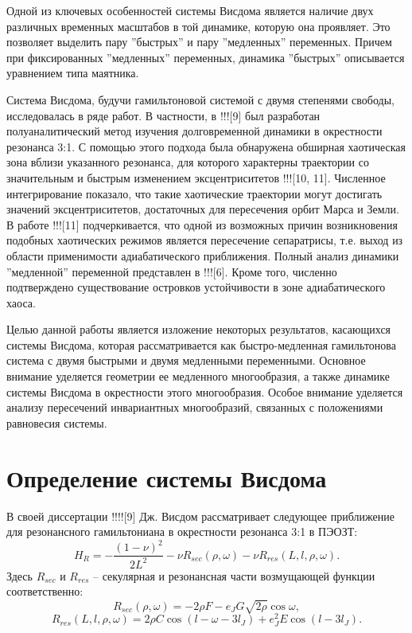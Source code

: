 Одной из ключевых особенностей системы Висдома является наличие двух различных временных масштабов в той динамике, которую она проявляет. Это позволяет выделить пару ''быстрых'' и пару ''медленных'' переменных. Причем при фиксированных ''медленных'' переменных, динамика ''быстрых'' описывается уравнением типа маятника.

Система Висдома, будучи гамильтоновой системой с двумя степенями свободы, исследовалась в ряде работ. В частности, в !!![9] был разработан полуаналитический метод изучения долговременной динамики в окрестности резонанса 3:1. С помощью этого подхода была обнаружена обширная хаотическая зона вблизи указанного резонанса, для которого характерны траектории со значительным и быстрым изменением эксцентриситетов !!![10, 11]. Численное интегрирование показало, что такие хаотические траектории могут достигать значений эксцентриситетов, достаточных для пересечения орбит Марса и Земли. В работе !!![11] подчеркивается, что одной из возможных причин возникновения подобных хаотических режимов является пересечение сепаратрисы, т.е. выход из области применимости адиабатического приближения. Полный анализ динамики ''медленной'' переменной представлен в !!![6]. Кроме того, численно подтверждено существование островков устойчивости в зоне адиабатического хаоса.

Целью данной работы является изложение некоторых результатов, касающихся системы Висдома, которая рассматривается как быстро-медленная гамильтонова система с двумя быстрыми и двумя медленными переменными. Основное внимание уделяется геометрии ее медленного многообразия, а также динамике системы Висдома в окрестности этого многообразия. Особое внимание уделяется анализу пересечений инвариантных многообразий, связанных с положениями равновесия системы.

\section{Определение системы Висдома}

В своей диссертации !!!![9] Дж. Висдом рассматривает следующее приближение для резонансного гамильтониана в окрестности резонанса 3:1 в ПЭОЗТ:
\begin{equation}
    H_R = - \frac{(1-\nu)^2}{2L^2} - \nu R_{sec}(\rho, \omega) - \nu R_{res}(L,l,\rho,\omega).
    \label{hamres}
\end{equation}
Здесь $R_{sec}$ и  $R_{res}$ -- секулярная и резонансная части возмущающей функции соответственно:
$$R_{sec}(\rho, \omega) = - 2 \rho F - e_J G \sqrt{2 \rho} \cos \omega,$$
$$R_{res}(L,l,\rho,\omega) = 2 \rho C \cos(l-\omega-3 l_J)+e_J^2E \cos(l - 3 l_J).$$

